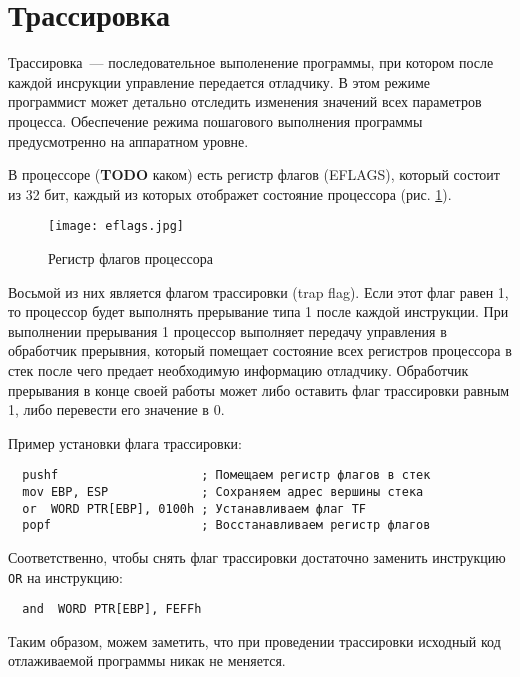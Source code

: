
\section{Трассировка}
Трассировка~--- последовательное выполенение программы, при котором после каждой
инсрукции управление передается отладчику. В этом режиме программист может
детально отследить изменения значений всех параметров процесса. Обеспечение
режима пошагового выполнения программы предусмотренно на аппаратном уровне.

В процессоре (\textbf{TODO} каком) есть регистр флагов (EFLAGS), который состоит
из 32 бит, каждый из которых отображет состояние процессора (рис.
\ref{fig:eflags}).
\begin{figure}[htpb]
  \centering
  \texttt{[image: eflags.jpg]}
  \caption{Регистр флагов процессора}
  \label{fig:eflags}
\end{figure}

Восьмой из них является флагом трассировки (trap flag). Если этот флаг равен 1,
то процессор будет выполнять прерывание типа 1 после каждой инструкции. При
выполнении прерывания 1 процессор выполняет передачу управления в обработчик
прерывния, который помещает состояние всех регистров процессора в стек после
чего предает необходимую информацию отладчику. Обработчик прерывания в конце
своей работы может либо оставить флаг трассировки равным 1, либо перевести его
значение в 0.

Пример установки флага трассировки:
\begin{verbatim}
  pushf                    ; Помещаем регистр флагов в стек
  mov EBP, ESP             ; Сохраняем адрес вершины стека
  or  WORD PTR[EBP], 0100h ; Устанавливаем флаг TF
  popf                     ; Восстанавливаем регистр флагов
\end{verbatim}
Соответственно, чтобы снять флаг трассировки достаточно заменить инструкцию
\verb!OR! на инструкцию:
\begin{verbatim}
  and  WORD PTR[EBP], FEFFh
\end{verbatim}

Таким образом, можем заметить, что при проведении трассировки исходный код
отлаживаемой программы никак не меняется.
